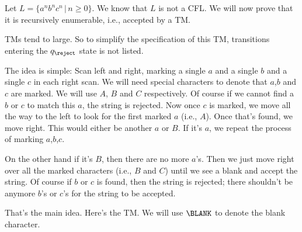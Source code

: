 \newpage
\begin{eg}
Let $L = \{a^n b^n c^n \,|\, n \geq 0\}$. We know that $L$ is not
a CFL. We will now prove that it is recursively enumerable, i.e.,
accepted by a TM.

TMs tend to large. So to simplify the specification of this TM,
transitions entering the $q_{\reject}$ state is not listed.

The idea is simple: Scan left and right, marking a single $a$ and
a single $b$ and a single $c$ in each right scan. We will need
special characters to denote that $a$,$b$ and $c$ are marked. We
will use $A$, $B$ and $C$ respectively. Of course if we cannot
find a $b$ or $c$ to match this $a$, the string is rejected. Now
once $c$ is marked, we move all the way to the left to look for
the first marked $a$ (i.e., $A$). Once that's found, we move
right. This would either be another $a$ or $B$. If it's $a$, we
repeat the process of marking $a$,$b$,$c$.

On the other hand if it's $B$, then there are no more $a$'s. Then
we just move right over all the marked characters (i.e., $B$ and
$C$) until we see a blank and accept the string. Of course if $b$
or $c$ is found, then the string is rejected; there shouldn't be
anymore $b$'s or $c$'s for the string to be accepted.

That's the main idea. Here's the TM. We will use $\BLANK$ to
denote the blank character.


\end{eg}

